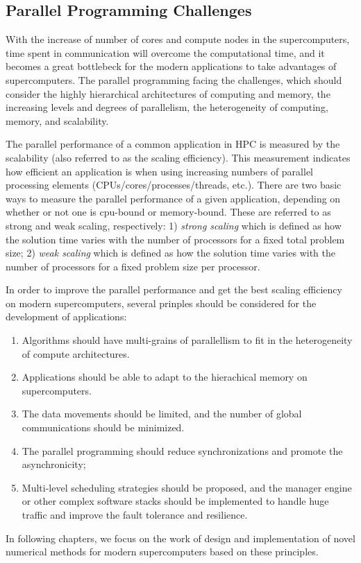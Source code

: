 \subsection{Parallel Programming Challenges} \label{Parallel Programming Challenges}

With the increase of number of cores and compute nodes in the supercomputers, time spent in communication will overcome the computational time, and it becomes a great bottlebeck for the modern applications to take advantages of supercomputers. The parallel programming facing the challenges, which should consider the highly hierarchical architectures of computing and memory, the increasing levels and degrees of parallelism, the heterogeneity of computing, memory, and scalability.

The parallel performance of a common application in HPC is measured by the scalability (also referred to as the scaling efficiency). This measurement indicates how efficient an application is when using increasing numbers of parallel processing elements (CPUs/cores/processes/threads, etc.). There are two basic ways to measure the parallel performance of a given application, depending on whether or not one is cpu-bound or memory-bound. These are referred to as strong and weak scaling, respectively: 1) \textit{strong scaling} which is defined as how the solution time varies with the number of processors for a fixed total problem size; 2) \textit{weak scaling} which is defined as how the solution time varies with the number of processors for a fixed problem size per processor.

In order to improve the parallel performance and get the best scaling efficiency on modern supercomputers, several prinples should be considered for the development of applications:

	\begin{enumerate}
		\item Algorithms should have multi-grains of parallellism to fit in the heterogeneity of compute architectures.
		\item Applications should be able to adapt to the hierachical memory on supercomputers.
		\item The data movements should be limited, and the number of global communications should be minimized.
		\item The parallel programming should reduce synchronizations and promote the asynchronicity;
		\item Multi-level scheduling strategies should be proposed,  and the manager engine or other complex software stacks should be implemented to handle huge traffic and improve the fault tolerance and resilience.
	\end{enumerate}

In following chapters, we focus on the work of design and implementation of novel numerical methods for modern supercomputers based on these principles.

\clearemptydoublepage